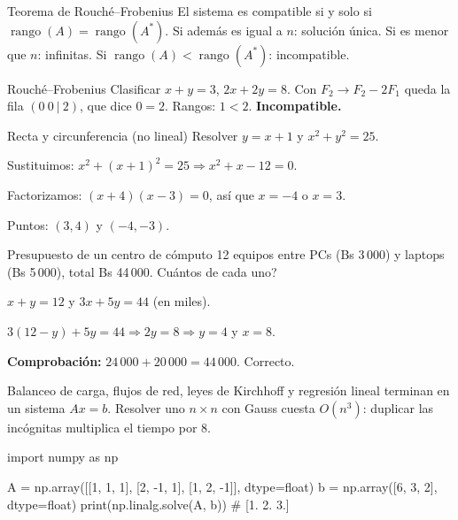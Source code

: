 \begin{tmdef}{Teorema de Rouch\'e--Frobenius}
El sistema es compatible si y solo si $\operatorname{rango}(A)=\operatorname{rango}(A^*)$. Si adem\'as es igual a $n$: soluci\'on \'unica. Si es menor que $n$: infinitas. Si $\operatorname{rango}(A)<\operatorname{rango}(A^*)$: incompatible.
\end{tmdef}

\begin{tmejemplo}{Rouch\'e--Frobenius}
Clasificar $x+y=3$, $2x+2y=8$. Con $F_2\to F_2-2F_1$ queda la fila $(0\ 0\ |\ 2)$, que dice $0=2$. Rangos: $1<2$. \textbf{Incompatible.}
\end{tmejemplo}

\begin{tmejemplo}{Recta y circunferencia (no lineal)}
Resolver $y=x+1$ y $x^2+y^2=25$.
\begin{tmpasos}
\item Sustituimos: $x^2+(x+1)^2=25\Rightarrow x^2+x-12=0$.
\item Factorizamos: $(x+4)(x-3)=0$, as\'i que $x=-4$ o $x=3$.
\item Puntos: $(3, 4)$ y $(-4,-3)$.
\end{tmpasos}
\end{tmejemplo}

\begin{tmejemplo}{Presupuesto de un centro de c\'omputo}
12 equipos entre PCs (Bs 3\,000) y laptops (Bs 5\,000), total Bs 44\,000. \textquestiondown Cu\'antos de cada uno?
\begin{tmpasos}
\item $x+y=12$ y $3x+5y=44$ (en miles).
\item $3(12-y)+5y=44\Rightarrow 2y=8\Rightarrow y=4$ y $x=8$.
\item \textbf{Comprobaci\'on:} $24\,000+20\,000=44\,000$. Correcto.
\end{tmpasos}
\end{tmejemplo}

\begin{tmsistemas}
Balanceo de carga, flujos de red, leyes de Kirchhoff y regresi\'on lineal terminan en un sistema $Ax=b$. Resolver uno $n\times n$ con Gauss cuesta $O(n^3)$: duplicar las inc\'ognitas multiplica el tiempo por 8.
\end{tmsistemas}

\begin{tmcodigo}
import numpy as np

A = np.array([[1, 1, 1],
              [2, -1, 1],
              [1, 2, -1]], dtype=float)
b = np.array([6, 3, 2], dtype=float)
print(np.linalg.solve(A, b))    # [1. 2. 3.]
\end{tmcodigo}

